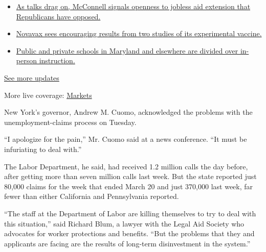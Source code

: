 \begin{itemize}
\tightlist
\item
  \href{https://www.nytimes3xbfgragh.onion/2020/08/04/world/coronavirus-cases.html?action=click\&pgtype=Article\&state=default\&region=MAIN_CONTENT_1\&context=storylines_live_updates\#link-2daa96b5}{As
  talks drag on, McConnell signals openness to jobless aid extension
  that Republicans have opposed.}
\item
  \href{https://www.nytimes3xbfgragh.onion/2020/08/04/world/coronavirus-cases.html?action=click\&pgtype=Article\&state=default\&region=MAIN_CONTENT_1\&context=storylines_live_updates\#link-1228a480}{Novavax
  sees encouraging results from two studies of its experimental
  vaccine.}
\item
  \href{https://www.nytimes3xbfgragh.onion/2020/08/04/world/coronavirus-cases.html?action=click\&pgtype=Article\&state=default\&region=MAIN_CONTENT_1\&context=storylines_live_updates\#link-4825b93}{Public
  and private schools in Maryland and elsewhere are divided over
  in-person instruction.}
\end{itemize}

\href{https://www.nytimes3xbfgragh.onion/2020/08/04/world/coronavirus-cases.html?action=click\&pgtype=Article\&state=default\&region=MAIN_CONTENT_1\&context=storylines_live_updates}{See
more updates}

More live coverage:
\href{https://www.nytimes3xbfgragh.onion/live/2020/08/04/business/stock-market-today-coronavirus?action=click\&pgtype=Article\&state=default\&region=MAIN_CONTENT_1\&context=storylines_live_updates}{Markets}

New York's governor, Andrew M. Cuomo, acknowledged the problems with the
unemployment-claims process on Tuesday.

``I apologize for the pain,'' Mr. Cuomo said at a news conference. ``It
must be infuriating to deal with.''

The Labor Department, he said, had received 1.2 million calls the day
before, after getting more than seven million calls last week. But the
state reported just 80,000 claims for the week that ended March 20 and
just 370,000 last week, far fewer than either California and
Pennsylvania reported.

``The staff at the Department of Labor are killing themselves to try to
deal with this situation,'' said Richard Blum, a lawyer with the Legal
Aid Society who advocates for worker protections and benefits. ``But the
problems that they and applicants are facing are the results of
long-term disinvestment in the system.''

